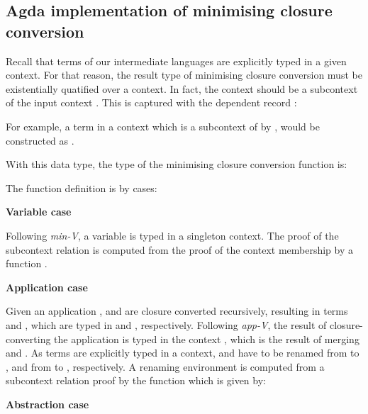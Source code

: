 \documentclass[bsc,frontabs,oneside,singlespacing,parskip,deptreport]{infthesis}
\theoremstyle{definition}
\theoremstyle{lemma}
\begin{document}
\subsection{Agda implementation of minimising closure conversion}
\label{sec:agda-impl-minim}

Recall that terms of our intermediate languages are explicitly typed
in a given context. For that reason, the result type of minimising
closure conversion must be existentially quatified over a
context. In fact, the context should be a subcontext of the input
context . This is captured with the dependent record
:


For example, a term  in a context  which is a subcontext
of  by , would be constructed as .

With this data type, the type of the minimising closure conversion
function is:


The function definition is by cases:

\textbf{Variable case}


Following \textit{min-V}, a variable is typed in a singleton
context. The proof of the subcontext relation is computed from the
proof of the context membership by a function .

\textbf{Application case}


Given an application ,  and  are closure
converted recursively, resulting in terms  and , which
are typed in  and , respectively. Following
\textit{app-V}, the result of closure-converting the application is
typed in the context , which is the result of merging 
and . As terms are explicitly typed in a context,  and
 have to be renamed from  to , and from 
to , respectively. A renaming environment is computed from a
subcontext relation proof by the function  which is given by:


\textbf{Abstraction case}
\end{document}
